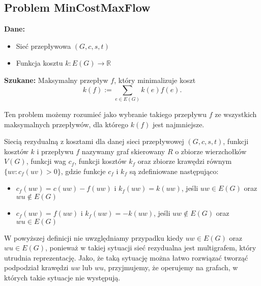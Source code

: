\subsection{Problem MinCostMaxFlow}
\textbf{Dane:}
\begin{itemize}
	\item Sieć przepływowa $(G, c, s, t)$
	\item Funkcja kosztu $k : E(G) \to \mathbb{R}$
\end{itemize}

\textbf{Szukane:}
Maksymalny przepływ $f$, który minimalizuje koszt 
\[k(f) := \sum_{e\in E(G)}k(e)f(e).\]

Ten problem możemy rozumieć jako wybranie takiego przepływu $f$ 
ze wszystkich maksymalnych przepływów, dla którego
$k(f)$ jest najmniejsze. 

\begin{defi}
	Siecią rezydualną z kosztami dla danej sieci przepływowej
	$(G, c, s, t)$, funkcji kosztów $k$ i przepływu $f$ nazywamy
	graf skierowany $R$ o zbiorze wierzchołków $V(G)$, funkcji
	wag $c_f$, funkcji kosztów $k_f$ oraz zbiorze 
	krawędzi równym $\{ uv: c_f(uv) > 0\}$, gdzie funkcje 
	$c_f$ i $k_f$ są zdefiniowane następująco:
	\begin{itemize}
		\item $c_f(uw) = c(uw) - f(uw)$ i $k_f(uw) = k(uw)$,
		jeśli $uw \in E(G)$ oraz $wu \not \in E(G)$
		\item $c_f(uw) = f(uw)$ i $k_f(uw) = -k(uw)$,
		jeśli $uw \not \in E(G)$ oraz $wu \in E(G)$
	\end{itemize} 
\end{defi}
W powyższej definicji nie uwzględniamy przypadku kiedy 
$uw \in E(G)$ oraz $wu \in E(G)$, ponieważ w takiej sytuacji
sieć rezydualna jest multigrafem, który utrudnia reprezentację. 
Jako, że taką sytuację można łatwo rozwiązać tworząć podpodział
krawędzi $uw$ lub $wu$, przyjmujemy, że operujemy na grafach,
w których takie sytuacje nie występują.

